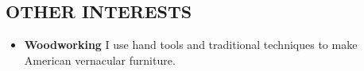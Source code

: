 \documentclass{res}
\begin{document}
\begin{resume}
 \section{OTHER INTERESTS}
   \begin{itemize}
     \item \textbf{Woodworking}	I use hand tools and traditional techniques to make American vernacular furniture.
   \end{itemize}


\end{resume}
\end{document}
